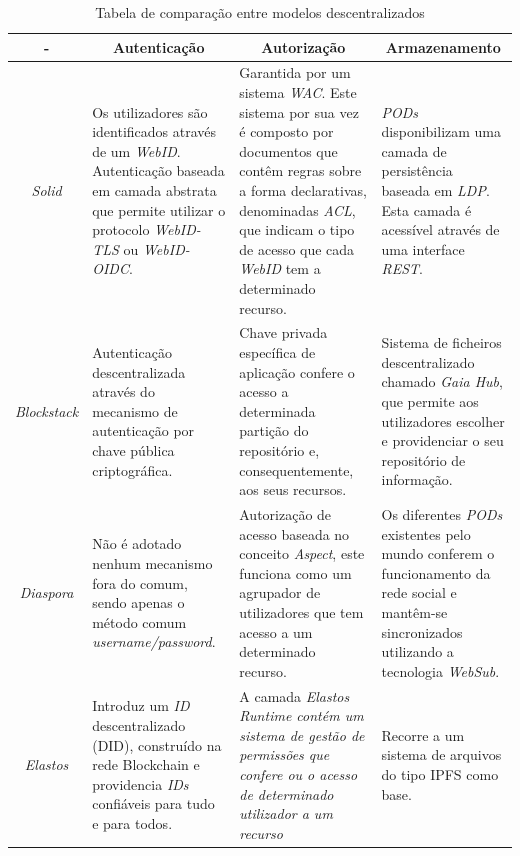 \begin{center}
\small
\begin{longtable}{c|p{4cm}|p{4cm}|p{4cm}}
\caption{Tabela de comparação entre modelos descentralizados}
\label{tabela_comparacao_modelos_descentralizados}
\\
\toprule 
    \multicolumn{1}{c}{-} &
    \multicolumn{1}{c}{Autenticação} &
    \multicolumn{1}{c}{Autorização} &
    \multicolumn{1}{c}{Armazenamento}
    \\ \midrule\addlinespace[2pt] \endhead
\bottomrule\endfoot
\endlastfoot

\emph{Solid} & Os utilizadores são identificados através de um \emph{WebID}. Autenticação baseada em camada abstrata que permite utilizar o protocolo \emph{WebID-TLS} ou \emph{WebID-OIDC}\cite{solid_spec}. &  Garantida por um sistema \emph{\acrshort{WAC}}. Este sistema por sua vez é composto por documentos que contêm regras sobre a forma declarativas, denominadas \emph{\acrfull{ACL}}, que indicam o tipo de acesso que cada \emph{WebID} tem a determinado recurso\cite{solid_web_access_control}. & \emph{PODs} disponibilizam uma camada de persistência baseada em \emph{\acrshort{LDP}}. Esta camada é acessível através de uma interface \emph{\acrshort{REST}}\cite{solid_spec}. \\
\emph{Blockstack} & Autenticação descentralizada através do mecanismo de autenticação por chave pública criptográfica\cite{blockstack_white_paper}. & Chave privada específica de aplicação confere o acesso a determinada partição do repositório e, consequentemente, aos seus recursos\cite{blockstack_white_paper}. & Sistema de ficheiros descentralizado chamado \emph{Gaia Hub}, que permite aos utilizadores escolher e providenciar o seu repositório de informação\cite{blockstack_white_paper}. \\
\emph{Diaspora} & Não é adotado nenhum mecanismo fora do comum, sendo apenas o método comum \emph{username/password}\cite{diaspora_wiki}. & Autorização de acesso baseada no conceito \emph{Aspect}, este funciona como um agrupador de utilizadores que tem acesso a um determinado recurso\cite{diaspora_wiki}. & Os diferentes \emph{PODs} existentes pelo mundo conferem o funcionamento da rede social e mantêm-se sincronizados utilizando a tecnologia \emph{WebSub}\cite{diaspora_wiki}. \\
\emph{Elastos} & Introduz um \emph{ID} descentralizado (\acrshort{DID}), construído na rede Blockchain e providencia \emph{IDs} confiáveis para tudo e para todos\cite{elastos_white_paper}. & A camada \emph{Elastos Runtime contém um sistema de gestão de permissões que confere ou o acesso de determinado utilizador a um recurso}\cite{elastos_white_paper} & Recorre a um sistema de arquivos do tipo \acrshort{IPFS} como base\cite{elastos_developer}.
\end{longtable}
\end{center}


